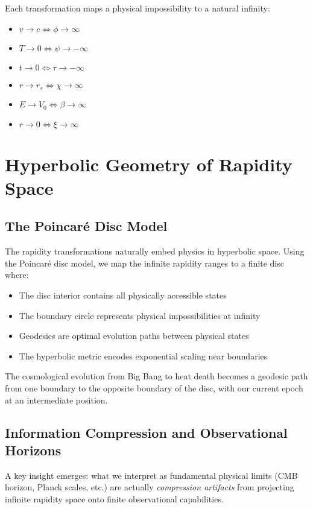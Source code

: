 \documentclass[12pt,a4paper]{article}
\begin{document}
Each transformation maps a physical impossibility to a natural infinity:
\begin{itemize}
    \item $v \to c \Leftrightarrow \phi \to \infty$
    \item $T \to 0 \Leftrightarrow \psi \to -\infty$
    \item $t \to 0 \Leftrightarrow \tau \to -\infty$
    \item $r \to r_s \Leftrightarrow \chi \to \infty$
    \item $E \to V_0 \Leftrightarrow \beta \to \infty$
    \item $r \to 0 \Leftrightarrow \xi \to \infty$
\end{itemize}

\section{Hyperbolic Geometry of Rapidity Space}

\subsection{The Poincar\'e Disc Model}

The rapidity transformations naturally embed physics in hyperbolic space. Using the Poincar\'e disc model, we map the infinite rapidity ranges to a finite disc where:
\begin{itemize}
    \item The disc interior contains all physically accessible states
    \item The boundary circle represents physical impossibilities at infinity
    \item Geodesics are optimal evolution paths between physical states
    \item The hyperbolic metric encodes exponential scaling near boundaries
\end{itemize}

The cosmological evolution from Big Bang to heat death becomes a geodesic path from one boundary to the opposite boundary of the disc, with our current epoch at an intermediate position.

\subsection{Information Compression and Observational Horizons}

A key insight emerges: what we interpret as fundamental physical limits (CMB horizon, Planck scales, etc.) are actually \textit{compression artifacts} from projecting infinite rapidity space onto finite observational capabilities.
\end{document}
